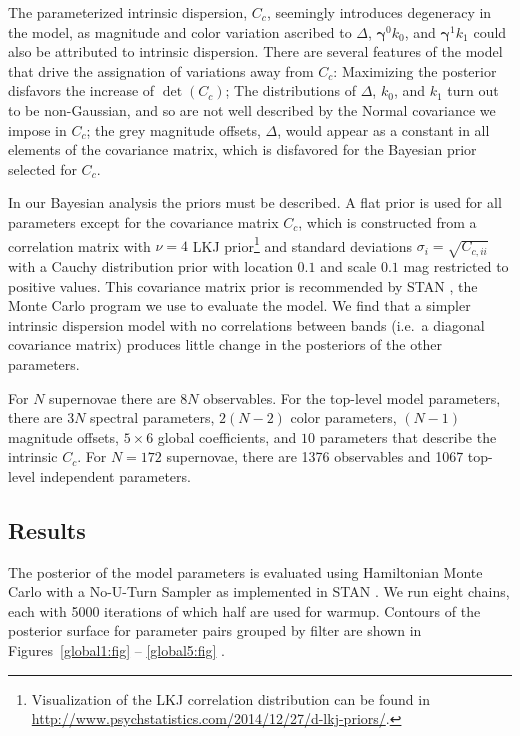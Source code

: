 \documentclass{aastex61}   	%
\begin{document}
The parameterized intrinsic dispersion, $C_c$, seemingly introduces degeneracy in the model, as magnitude and color variation
ascribed to $\Delta$, $\pmb{\gamma}^0 k_0$, and $\pmb{\gamma}^1 k_1$ could also be attributed to intrinsic dispersion.  There are several features of the model
that drive the assignation of variations away from $C_c$:  Maximizing the posterior disfavors the increase of $\det{(C_c)}$;
The distributions of $\Delta$, $k_0$, and $k_1$ turn out to
be non-Gaussian, and so are not well described by the Normal covariance we impose in $C_c$; the grey magnitude offsets, $\Delta$, would appear as a constant
in all elements of the covariance matrix, which is disfavored for the Bayesian prior selected for $C_c$.

In our Bayesian analysis the priors must be described.  A flat prior is used for all parameters except
for the covariance matrix $C_c$, which is constructed from a correlation matrix with  $\nu=4$  LKJ prior\footnote{
Visualization of the LKJ correlation distribution can be found in \url{http://www.psychstatistics.com/2014/12/27/d-lkj-priors/}.}
\citep{Lewandowski20091989} and standard
deviations $\sigma_i = \sqrt{C_{c,ii}}$ with a  Cauchy distribution prior with location
 $0.1$ and scale $0.1$ mag restricted to positive values.
This covariance matrix prior is recommended by STAN \citep{stan}, the Monte Carlo program we use to evaluate the model.
 We find that a simpler intrinsic dispersion model with no correlations between bands
 (i.e.\ a  diagonal covariance matrix) produces little change in the posteriors of
 the other parameters.

For $N$ supernovae there are $8N$ observables.  For the top-level model parameters, there are $3N$ spectral parameters, $2(N-2)$
color parameters, $(N-1)$ magnitude offsets,  $5 \times 6$ global coefficients, and $10$ parameters that describe the intrinsic
$C_c$.  For $N=172$ supernovae, there are 1376 observables and 1067 top-level independent parameters.

 
\subsection{Results}
\label{results:sec}
The posterior of the model parameters is evaluated using Hamiltonian Monte Carlo with a No-U-Turn
Sampler as implemented in
STAN \citep{stan}.  We run eight chains, each with 5000 iterations of which
half are used for warmup.
Contours of the posterior surface for parameter pairs grouped by filter are shown in Figures~\ref{global1:fig} -- \ref{global5:fig} .
\end{document}
